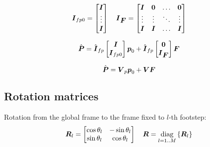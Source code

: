 \documentclass[12pt,a4paper]{article}
\begin{document}
\begin{equation*}
    \mbox{\boldmath $I$}_{fp0} = 
    \begin{bmatrix}
        \mbox{\boldmath $I$}\\
        \vdots\\
        \mbox{\boldmath $I$}\\
    \end{bmatrix}
    \quad
    \mbox{\boldmath $I$}_{\mbox{\boldmath $F$}} = 
    \begin{bmatrix}
        \mbox{\boldmath $I$}   &   \mbox{\boldmath $0$}   & \dots     & \mbox{\boldmath $0$} \\
        \vdots  &   \vdots  & \ddots    & \vdots \\
        \mbox{\boldmath $I$}   &   \mbox{\boldmath $I$}   & \dots     & \mbox{\boldmath $I$} \\
    \end{bmatrix}
\end{equation*}

\begin{equation*}
    \hat{\mbox{\boldmath $P$}} = 
    \hat{\mbox{\boldmath $I$}}_{fp}
    \begin{bmatrix}
        \mbox{\boldmath $I$} \\
        \mbox{\boldmath $I$}_{fp0}\\
    \end{bmatrix} 
    \mbox{\boldmath $p$}_0 
    + 
    \hat{\mbox{\boldmath $I$}}_{fp}
    \begin{bmatrix}
        \mbox{\boldmath $0$} \\
        \mbox{\boldmath $I$}_{\mbox{\boldmath $F$}} \\
    \end{bmatrix} 
    \mbox{\boldmath $F$}
\end{equation*}

\begin{equation*}
    \hat{\mbox{\boldmath $P$}} = 
    \mbox{\boldmath $V$}_p
    \mbox{\boldmath $p$}_0 
    + 
    \mbox{\boldmath $V$}
    \mbox{\boldmath $F$}
\end{equation*}


\subsection{Rotation matrices}

Rotation from the global frame to the frame fixed to $l$-th footstep:
\begin{equation*}
    \mbox{\boldmath $R$}_l = 
    \begin{bmatrix}
        \cos{\theta_l}  &   -\sin{\theta_l} \\
        \sin{\theta_l}  &   \cos{\theta_l} \\
    \end{bmatrix}
    \quad
    \mbox{\boldmath $R$} = \underset{l = 1..M}{\operatorname{diag}}\left\{\mbox{\boldmath $R$}_l\right\}
\end{equation*}
\end{document}
